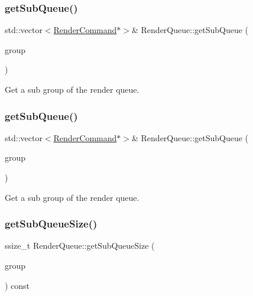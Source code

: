 \subsubsection{\texorpdfstring{get\+Sub\+Queue()}{getSubQueue()}\hspace{0.1cm}{\footnotesize\ttfamily [1/2]}}
{\footnotesize\ttfamily std\+::vector$<$\hyperlink{classRenderCommand}{Render\+Command}$\ast$$>$\& Render\+Queue\+::get\+Sub\+Queue (\begin{DoxyParamCaption}\item[{\hyperlink{classRenderQueue_a546a6ca0aa906f2fd8f86c698c76854e}{Q\+U\+E\+U\+E\+\_\+\+G\+R\+O\+UP}}]{group }\end{DoxyParamCaption})\hspace{0.3cm}{\ttfamily [inline]}}

Get a sub group of the render queue. \mbox{\label{classRenderQueue_af6486c291c439094adcd12d197a8f200}} 
\subsubsection{\texorpdfstring{get\+Sub\+Queue()}{getSubQueue()}\hspace{0.1cm}{\footnotesize\ttfamily [2/2]}}
{\footnotesize\ttfamily std\+::vector$<$\hyperlink{classRenderCommand}{Render\+Command}$\ast$$>$\& Render\+Queue\+::get\+Sub\+Queue (\begin{DoxyParamCaption}\item[{\hyperlink{classRenderQueue_a546a6ca0aa906f2fd8f86c698c76854e}{Q\+U\+E\+U\+E\+\_\+\+G\+R\+O\+UP}}]{group }\end{DoxyParamCaption})\hspace{0.3cm}{\ttfamily [inline]}}

Get a sub group of the render queue. \mbox{\label{classRenderQueue_a0e2d32f2bb26fac3c08b6a7e8d827b04}} 
\subsubsection{\texorpdfstring{get\+Sub\+Queue\+Size()}{getSubQueueSize()}\hspace{0.1cm}{\footnotesize\ttfamily [1/2]}}
{\footnotesize\ttfamily ssize\+\_\+t Render\+Queue\+::get\+Sub\+Queue\+Size (\begin{DoxyParamCaption}\item[{\hyperlink{classRenderQueue_a546a6ca0aa906f2fd8f86c698c76854e}{Q\+U\+E\+U\+E\+\_\+\+G\+R\+O\+UP}}]{group }\end{DoxyParamCaption}) const\hspace{0.3cm}{\ttfamily [inline]}}


